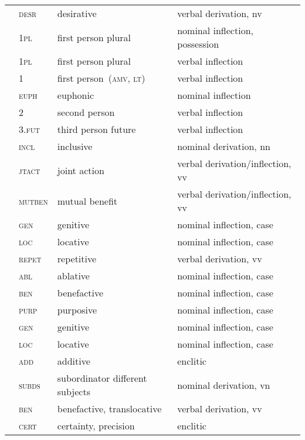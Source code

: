 \begin{refsection}
\begin{small}
\begin{longtable}{*{4}{@{\hspace{0.75ex}}l}@{\hspace{0ex}}}
 		& \textsc{desr} 		& desirative 	& verbal derivation, nv\\
 	& 1\textsc{pl} 	& first person plural 	& nominal inflection, possession\\
 	& 1\textsc{pl} 	& first person plural 	& verbal inflection\\
 	& 1 	& first person~(\textsc{amv}, \textsc{lt}) 	& verbal inflection\\
 	& \textsc{euph} 		& euphonic 	& nominal inflection\\
 		& 2 	& second person 	& verbal inflection\\
		& 3.\textsc{fut} 	& third person future 	& verbal inflection\\
 		& \textsc{incl} 	& inclusive 	& nominal derivation, nn\\
 		& \textsc{jtact} 	& joint action 	& verbal derivation/inflection, vv \\
 		& \textsc{mutben} 	& mutual benefit 	& verbal derivation/inflection, vv \\
 	& \textsc{gen} 	& genitive 	& nominal inflection, case\\
 	& \textsc{loc} 	& locative 	& nominal inflection, case\\
 	& \textsc{repet} 	& repetitive 	& verbal derivation, vv\\
 	& \textsc{abl} 		& ablative 	& nominal inflection, case\\
 	& \textsc{ben} 		& benefactive 	& nominal inflection, case\\
 	& \textsc{purp} 		& purposive 	& nominal inflection, case\\
 	& \textsc{gen} 	& genitive 	& nominal inflection, case\\
 	& \textsc{loc} 	& locative 	& nominal inflection, case\\
 		& \textsc{add} 		& additive 	& enclitic\\
		& \textsc{subds} 	& subordinator different subjects 	& nominal derivation, vn\\
		& \textsc{ben} 	& benefactive, translocative 	& verbal derivation, vv\\
 		& \textsc{cert} 		& certainty, precision 	& enclitic\\

\end{longtable}
\end{small}
\end{refsection}
